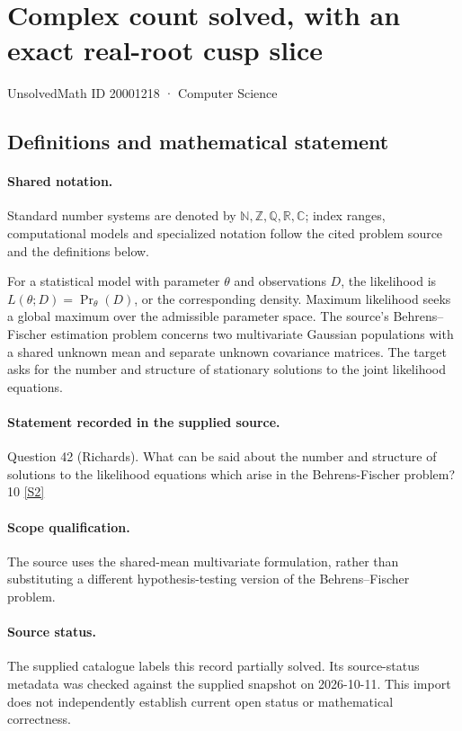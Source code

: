 \documentclass[11pt]{article}
\newcommand{\sref}[2]{\hyperlink{source:#1:#2}{[S#2]}}
\begin{document}
\setcounter{section}{20001217}
\section{Complex count solved, with an exact real-root cusp slice}\label{20001218}
{\small\sffamily UnsolvedMath ID 20001218 · Computer Science}
\subsection{Definitions and mathematical statement}

\paragraph{Shared notation.}Standard number systems are denoted by $\mathbb N,\mathbb Z,\mathbb Q,\mathbb R,\mathbb C$; index ranges, computational models and specialized notation follow the cited problem source and the definitions below.


For a statistical model with parameter $\theta$ and observations $D$, the likelihood is $L(\theta;D)=\Pr_\theta(D)$, or the corresponding density. Maximum likelihood seeks a global maximum over the admissible parameter space. The source's Behrens--Fischer estimation problem concerns two multivariate Gaussian populations with a shared unknown mean and separate unknown covariance matrices. The target asks for the number and structure of stationary solutions to the joint likelihood equations.
\paragraph{Statement recorded in the supplied source.}
Question 42 (Richards). What can be said about the number and structure of solutions to the likelihood equations which arise in the Behrens-Fischer problem? 10 \sref{20001218}{2}
\paragraph{Scope qualification.}
The source uses the shared-mean multivariate formulation, rather than substituting a different hypothesis-testing version of the Behrens--Fischer problem.
\paragraph{Source status.}
The supplied catalogue labels this record partially solved. Its source-status metadata was checked against the supplied snapshot on 2026-10-11. This import does not independently establish current open status or mathematical correctness.
\end{document}
